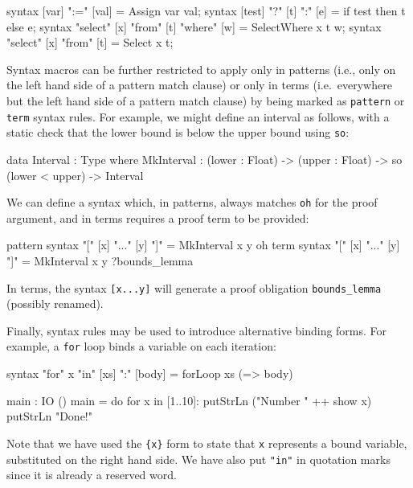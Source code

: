 \begin{code}
syntax [var] ":=" [val]                    = Assign var val;
syntax [test] "?" [t] ":" [e]              = if test then t else e;
syntax "select" [x] "from" [t] "where" [w] = SelectWhere x t w;
syntax "select" [x] "from" [t]             = Select x t;
\end{code}

\noindent
Syntax macros can be further restricted to apply only in patterns (i.e., only on the left hand side of a pattern match clause) or only in terms (i.e.\ everywhere but the left hand side of a pattern match clause) by being marked as \texttt{pattern} or \texttt{term} syntax rules.
For example, we might define an interval as follows, with a static check that the lower bound is below the upper bound using \texttt{so}:

\begin{code}
data Interval : Type where
   MkInterval : (lower : Float) -> (upper : Float) -> 
                so (lower < upper) -> Interval
\end{code}

\noindent
We can define a syntax which, in patterns, always matches \texttt{oh} for the proof argument, and in terms requires a proof term to be provided:

\begin{code}
pattern syntax "[" [x] "..." [y] "]" = MkInterval x y oh
term    syntax "[" [x] "..." [y] "]" = MkInterval x y ?bounds_lemma
\end{code} 

\noindent
In terms, the syntax \texttt{[x...y]} will generate a proof obligation \texttt{bounds\_lemma} (possibly renamed).

Finally, syntax rules may be used to introduce alternative binding forms.
For example, a \texttt{for} loop binds a variable on each iteration:

\begin{code}
syntax "for" {x} "in" [xs] ":" [body] = forLoop xs (\x => body)
  
main : IO ()
main = do for x in [1..10]:
              putStrLn ("Number " ++ show x)
          putStrLn "Done!"
\end{code} 

\noindent
Note that we have used the \texttt{\{x\}} form to state that \texttt{x} represents a bound variable, substituted on the right hand side.
We have also put \texttt{"in"} in quotation marks since it is already a reserved word.

